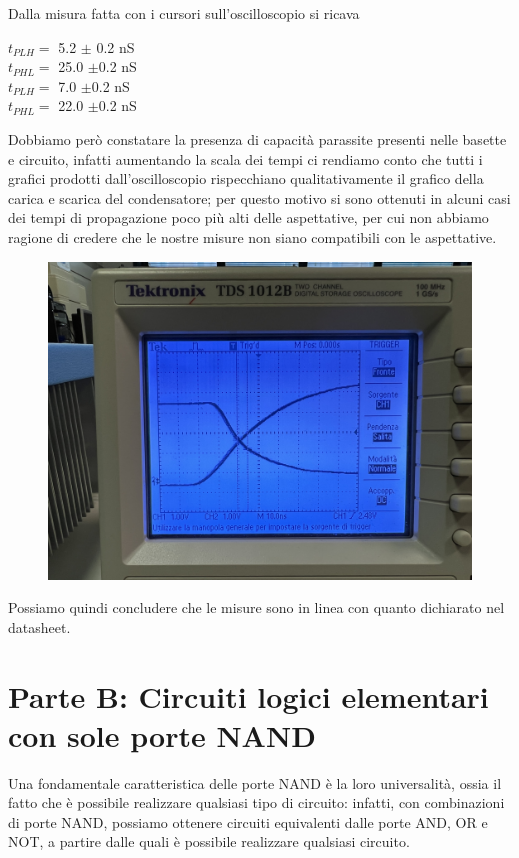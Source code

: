 \documentclass[10pt, a4paper, italian]{article}
\begin{document}
Dalla misura fatta con i cursori sull'oscilloscopio si ricava
\begin{multicols}{2}
    \centering
    $t_{PLH}=$ 5.2 $\pm$ 0.2 nS\\
    $t_{PHL}=$ 25.0 $\pm$0.2 nS\\
    
    
    $t_{PLH}=$ 7.0 $\pm$0.2 nS\\
    $t_{PHL}=$ 22.0 $\pm$0.2 nS\\
\end{multicols}
Dobbiamo però constatare la presenza di capacità parassite presenti nelle basette e circuito, infatti aumentando la scala dei tempi ci rendiamo conto che tutti i grafici prodotti dall'oscilloscopio rispecchiano qualitativamente il grafico della carica e scarica del condensatore; per questo motivo si sono ottenuti in alcuni casi dei tempi di propagazione poco più alti delle aspettative, per cui non abbiamo ragione di credere che le nostre misure non siano compatibili con le aspettative.
\begin{figure}
	\includegraphics[width=\textwidth]{carica}
\end{figure}
Possiamo quindi concludere che le misure sono in linea con quanto dichiarato nel datasheet.

\setcounter{section}{3}
\section*{Parte B: Circuiti logici elementari con sole porte NAND}
Una fondamentale caratteristica delle porte NAND è la loro universalità, ossia il fatto che è possibile realizzare qualsiasi tipo di circuito: infatti, con combinazioni di porte NAND, possiamo ottenere circuiti equivalenti dalle porte AND, OR e NOT, a partire dalle quali è possibile realizzare qualsiasi circuito.
\end{document}
